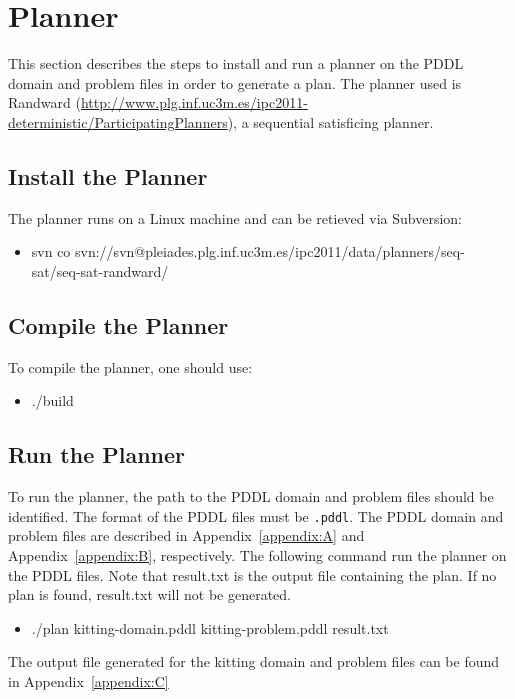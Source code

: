 \section{Planner}
This section describes the steps to install and run a planner on the PDDL domain and problem files in order to generate a plan. The planner used is Randward (\url{http://www.plg.inf.uc3m.es/ipc2011-deterministic/ParticipatingPlanners}), a sequential satisficing planner.

\subsection{Install the Planner}
The planner runs on a Linux machine and can be retieved via Subversion:
\begin{itemize}
\item svn co svn://svn@pleiades.plg.inf.uc3m.es/ipc2011/data/planners/seq-sat/seq-sat-randward/
\end{itemize}

\subsection{Compile the Planner}
To compile the planner, one should use:
\begin{itemize}
\item ./build
\end{itemize}

\subsection{Run the Planner}
To run the planner, the path to the PDDL domain and problem files should be identified. The format of the PDDL files must be \texttt{.pddl}. The PDDL domain and problem files are described in Appendix~\ref{appendix:A} and Appendix~\ref{appendix:B}, respectively. The following command run the planner on the PDDL files. Note that result.txt is the output file containing the plan. If no plan is found, result.txt will not be generated.
\begin{itemize}
\item ./plan kitting-domain.pddl kitting-problem.pddl result.txt
\end{itemize}

The output file generated for the kitting domain and problem files can be found in Appendix~\ref{appendix:C}